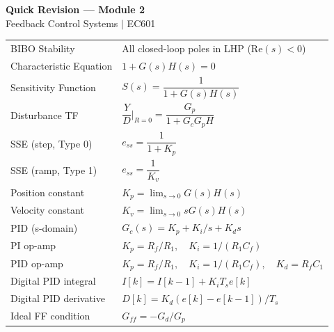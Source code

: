 \documentclass[12pt,a4paper]{article}
\begin{document}
\newpage
\begin{center}
  {\large\bfseries\color{myred} Quick Revision — Module 2}\\[3pt]
  {\small\color{mydark} Feedback Control Systems $|$ EC601}
\end{center}
\noindent{\color{myred}\rule{\linewidth}{1.2pt}}
\vspace{4pt}

\begin{tcolorbox}[formulabox, title={\textbf{Key Formulas at a Glance}}]
\begin{tabularx}{\linewidth}{B{4.8cm} X}
BIBO Stability          & All closed-loop poles in LHP ($\text{Re}(s)<0$) \\[2pt]
Characteristic Equation & $1 + G(s)H(s) = 0$ \\[2pt]
Sensitivity Function    & $S(s) = \dfrac{1}{1+G(s)H(s)}$ \\[2pt]
Disturbance TF          & $\dfrac{Y}{D}\big|_{R=0} = \dfrac{G_p}{1+G_cG_pH}$ \\[2pt]
SSE (step, Type 0)      & $e_{ss} = \dfrac{1}{1+K_p}$ \\[2pt]
SSE (ramp, Type 1)      & $e_{ss} = \dfrac{1}{K_v}$ \\[2pt]
Position constant       & $K_p = \lim_{s\to0}G(s)H(s)$ \\[2pt]
Velocity constant       & $K_v = \lim_{s\to0}sG(s)H(s)$ \\[2pt]
PID (s-domain)          & $G_c(s) = K_p + K_i/s + K_d s$ \\[2pt]
PI op-amp               & $K_p = R_f/R_1,\quad K_i = 1/(R_1C_f)$ \\[2pt]
PID op-amp              & $K_p = R_f/R_1,\quad K_i = 1/(R_1C_f),\quad K_d = R_fC_1$ \\[2pt]
Digital PID integral    & $I[k] = I[k-1] + K_i T_s e[k]$ \\[2pt]
Digital PID derivative  & $D[k] = K_d(e[k]-e[k-1])/T_s$ \\[2pt]
Ideal FF condition      & $G_{ff} = -G_d/G_p$
\end{tabularx}
\end{tcolorbox}

\vspace{5pt}
\end{document}

